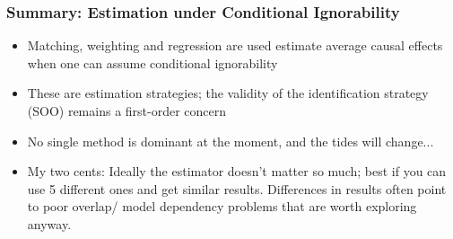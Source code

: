 \documentclass[xcolor=dvipsnames]{beamer}
\newcommand\indep{\protect\mathpalette{\protect\independenT}{\perp}}
\def\independenT#1#2{\mathrel{\rlap{$#1#2$}\mkern2mu{#1#2}}}
\begin{document}

\begin{frame}
\frametitle{Summary: Estimation under Conditional Ignorability}
\small
\begin{itemize}
\item<1-> Matching, weighting and regression are used estimate average causal effects when one can assume conditional ignorability
\item<2-> These are estimation strategies; the validity of the identification strategy (SOO) remains a first-order concern
\item<3-> No single method is dominant at the moment, and the tides will change...
\item<4-> My two cents: Ideally the estimator doesn't matter so much; best if you can use 5 different ones and get similar results. Differences in results often point to poor overlap/ model dependency problems that are worth exploring anyway.
\end{itemize}

\end{frame}







\end{document}
